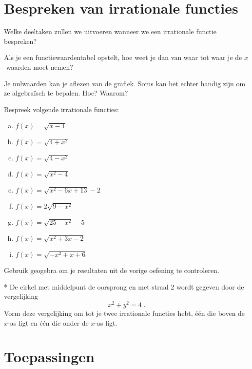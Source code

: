 \documentclass[12pt,twoside]{article}
\begin{document}
\pagebreak
\section{Bespreken van irrationale functies}

\begin{oefening}
Welke deeltaken zullen we uitvoeren wanneer we een irrationale functie bespreken?
\end{oefening}

\begin{oefening}
Als je een functiewaardentabel opstelt, hoe weet je dan van waar tot waar je de $x$-waarden moet nemen?
\end{oefening}

\begin{oefening}
Je nulwaarden kan je aflezen van de grafiek. Soms kan het echter handig zijn om ze algebraïsch te bepalen. Hoe? Waarom?
\end{oefening}

\begin{oefening}
Bespreek volgende irrationale functies:
\begin{enumerate}[(a)]
  \item $f(x)=\sqrt{x-1}$
  \item $f(x)=\sqrt{4+x^2}$
  \item $f(x)=\sqrt{4-x^2}$
  \item $f(x)=\sqrt{x^2-4}$
  \item $f(x)=\sqrt{x^2-6x+13}-2$
  \item $f(x)=2\sqrt{9-x^2}$
  \item $f(x)=\sqrt{25-x^2}-5$
  \item $f(x)=\sqrt{x^2+3x-2}$
  \item $f(x)=\sqrt{-x^2+x+6}$
\end{enumerate}
\end{oefening}

\begin{oefening}
Gebruik geogebra om je resultaten uit de vorige oefening te controleren.
\end{oefening}

\begin{oefening}*
De cirkel met middelpunt de oorsprong en met straal 2 wordt gegeven door de vergelijking
$$x^2+y^2=4\;.$$
Vorm deze vergelijking om tot je twee irrationale functies hebt, één die boven de $x$-as ligt en één die onder de $x$-as ligt.
\end{oefening}

\pagebreak
\section{Toepassingen}
\end{document}
